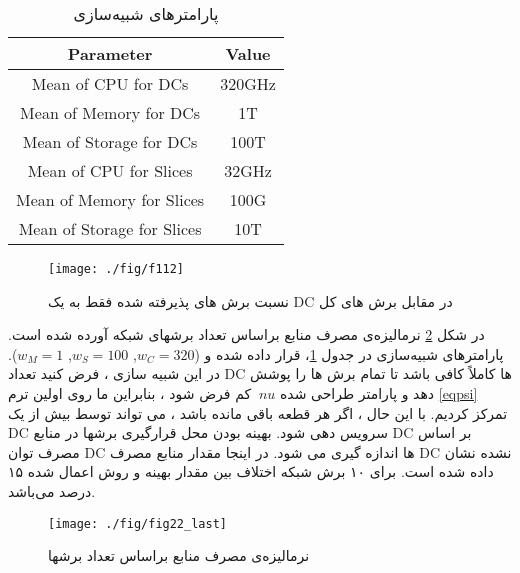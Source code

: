 \begin{small}
	\begin{table}
		\caption {پارامترهای شبیه‌سازی} \label{table:1}
		\begin{latin}	
		\begin{center}
			\begin{tabular}{||c c ||}
				\hline
				Parameter & Value \\ [0.5ex]
				\hline\hline
				Mean of CPU for DCs & 320GHz\\
				\hline
				Mean of Memory for DCs & 1T\\
				\hline
				Mean of Storage for DCs & 100T \\
				\hline
				Mean of CPU for Slices & 32GHz\\
				\hline
				Mean of Memory for Slices & 100G\\
				\hline
				Mean of Storage for Slices & 10T \\ [1ex]
				\hline
			\end{tabular}
		\end{center}
	\end{latin}
	\end{table}
\end{small}
\begin{figure}%
	\centering
	\texttt{[image: ./fig/f112]}
	\caption{نسبت برش های پذیرفته شده فقط به یک 	DC در مقابل برش های کل}
	\label{fig:f1}
\end{figure}
در شکل \ref{fig:f2}
نرمالیزه‌ی مصرف منابع بر‌اساس تعداد برشهای شبکه آورده شده است. پارامترهای شبیه‌سازی در جدول \ref{table:1}، قرار داده شده و 
($w_C = 320$, $w_S = 100$, $w_M =1$).
در این شبیه سازی ، فرض کنید تعداد DC ها کاملاً کافی باشد تا تمام برش ها را پوشش دهد و پارامتر طراحی شده $ \ nu $ کم فرض شود ، بنابراین ما روی اولین ترم \eqref{eqpsi} تمرکز کردیم.
با این حال ، اگر هر قطعه باقی مانده باشد ، می تواند توسط بیش از یک DC سرویس دهی شود.
بهینه بودن محل قرارگیری برشها در منابع DC بر اساس مصرف توان DC ها اندازه گیری می شود.
در اینجا مقدار منابع  مصرف DC نشده نشان داده شده است. برای ۱۰ برش شبکه اختلاف بین مقدار بهینه و روش اعمال شده ۱۵ درصد می‌باشد. 
\begin{figure}%
	\centering
	\texttt{[image: ./fig/fig22\_last]}
	\caption{نرمالیزه‌ی مصرف منابع بر‌اساس تعداد برشها}
	\label{fig:f2}
\end{figure}

